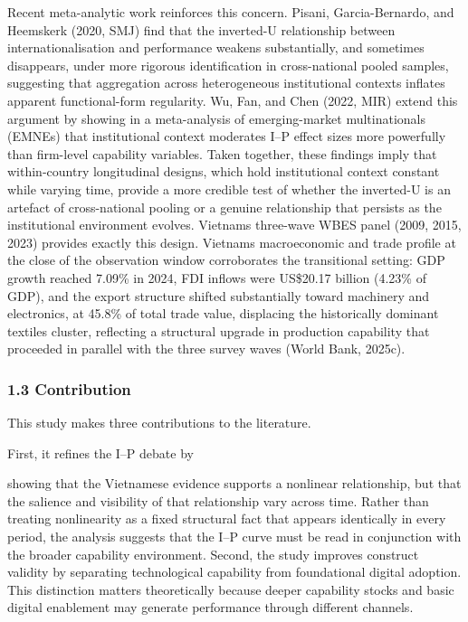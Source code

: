 \documentclass[12pt,a4paper]{article}
\begin{document}
Recent meta-analytic work reinforces this concern. Pisani,
Garcia-Bernardo, and Heemskerk (2020, SMJ) find that the inverted-U
relationship between internationalisation and performance weakens
substantially, and sometimes disappears, under more rigorous
identification in cross-national pooled samples, suggesting that
aggregation across heterogeneous institutional contexts inflates
apparent functional-form regularity. Wu, Fan, and Chen (2022, MIR)
extend this argument by showing in a meta-analysis of emerging-market
multinationals (EMNEs) that institutional context moderates I--P effect
sizes more powerfully than firm-level capability variables. Taken
together, these findings imply that within-country longitudinal designs,
which hold institutional context constant while varying time, provide a
more credible test of whether the inverted-U is an artefact of
cross-national pooling or a genuine relationship that persists as the
institutional environment evolves. Vietnam\textquotesingle s three-wave
WBES panel (2009, 2015, 2023) provides exactly this design.
Vietnam\textquotesingle s macroeconomic and trade profile at the close
of the observation window corroborates the transitional setting: GDP
growth reached 7.09\% in 2024, FDI inflows were US\$20.17 billion
(4.23\% of GDP), and the export structure shifted substantially toward
machinery and electronics, at 45.8\% of total trade value, displacing
the historically dominant textiles cluster, reflecting a structural
upgrade in production capability that proceeded in parallel with the
three survey waves (World Bank, 2025c).

\hypertarget{13-contribution}{%
\subsubsection{1.3 Contribution}\label{13-contribution}}

This study makes three contributions to the literature.

First, it refines the I--P debate by

showing that the Vietnamese evidence supports a nonlinear relationship,
but that the salience and visibility of that relationship vary across
time. Rather than treating nonlinearity as a fixed structural fact that
appears identically in every period, the analysis suggests that the I--P
curve must be read in conjunction with the broader capability
environment. Second, the study improves construct validity by separating
technological capability from foundational digital adoption. This
distinction matters theoretically because deeper capability stocks and
basic digital enablement may generate performance through different
channels.
\end{document}
